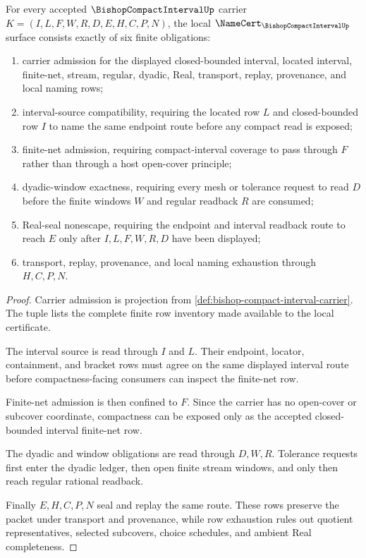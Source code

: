 \begin{theorem}
\label{thm:bishop-compact-interval-namecert-obligations}
For every accepted $\BishopCompactIntervalUp$ carrier $K=(I,L,F,W,R,D,E,H,C,P,N)$, the local $\NameCert_{\BishopCompactIntervalUp}$ surface consists exactly of six finite obligations:
\begin{enumerate}
\item carrier admission for the displayed closed-bounded interval, located interval, finite-net, stream, regular, dyadic, Real, transport, replay, provenance, and local naming rows;
\item interval-source compatibility, requiring the located row $L$ and closed-bounded row $I$ to name the same endpoint route before any compact read is exposed;
\item finite-net admission, requiring compact-interval coverage to pass through $F$ rather than through a host open-cover principle;
\item dyadic-window exactness, requiring every mesh or tolerance request to read $D$ before the finite windows $W$ and regular readback $R$ are consumed;
\item Real-seal nonescape, requiring the endpoint and interval readback route to reach $E$ only after $I,L,F,W,R,D$ have been displayed;
\item transport, replay, provenance, and local naming exhaustion through $H,C,P,N$.
\end{enumerate}
\end{theorem}
\begin{proof}
Carrier admission is projection from \autoref{def:bishop-compact-interval-carrier}. The tuple lists the complete finite row inventory made available to the local certificate.

The interval source is read through $I$ and $L$. Their endpoint, locator, containment, and bracket rows must agree on the same displayed interval route before compactness-facing consumers can inspect the finite-net row.

Finite-net admission is then confined to $F$. Since the carrier has no open-cover or subcover coordinate, compactness can be exposed only as the accepted closed-bounded interval finite-net row.

The dyadic and window obligations are read through $D,W,R$. Tolerance requests first enter the dyadic ledger, then open finite stream windows, and only then reach regular rational readback.

Finally $E,H,C,P,N$ seal and replay the same route. These rows preserve the packet under transport and provenance, while row exhaustion rules out quotient representatives, selected subcovers, choice schedules, and ambient Real completeness.
\end{proof}

